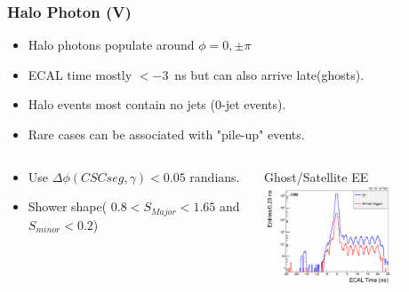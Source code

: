 \documentclass{beamer}
\begin{document}
\begin{frame}
\frametitle{Halo Photon (V)}
 \begin{minipage}[t]{0.85\paperwidth}
      \begin{tcolorbox}[colback=UNL@Cream!5,colframe=UMN@Maroon!40 ,title=\textcolor{UMN@Maroon}{\textbf{Halo Photon Event Properties}}]
       \begin{itemize}
          \item Halo photons populate around $\phi=0, \pm \pi$
          \item ECAL time mostly $ < -3$~ns but can also arrive late(ghosts).
          \item Halo events most contain no jets ($0$-jet events).
          \item Rare cases can be associated with "pile-up" events.     
       \end{itemize}  
      \end{tcolorbox}
  \end{minipage}
  \begin{minipage}[t]{0.9\paperwidth}
     \begin{columns}
        \begin{tcolorbox}[colback=UNL@Cream!5,colframe=UMN@Maroon!40,title=\textcolor{UMN@Maroon}{\textbf{Halo Photon Tagging Criteria}}] 
        \begin{itemize}
         \item Use $\Delta\phi(CSC seg, \gamma) < 0.05$ randians.
         \item Shower shape( $0.8 < S_{Major} < 1.65 $ and $ S_{minor} < 0.2 $)
        \end{itemize}
        \end{tcolorbox}
        \begin{varblock}[2.5cm]{Ghost/Satellite EE}
        \centering      
        \includegraphics[height=2.95cm,width=0.29\paperwidth]{THESISPLOTS/halo_EE_Time.png} 
        \end{varblock}
     \end{columns} 
  \end{minipage}   
\end{frame}
\end{document}
